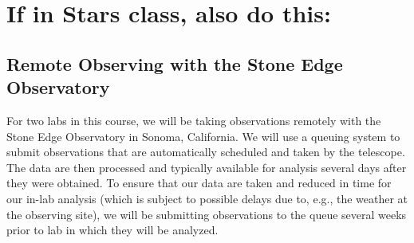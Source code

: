  
 
 

\section{If in Stars class, also do this:}
\subsection{Remote Observing with the Stone Edge Observatory}

For two labs in this course, we will be taking observations remotely with the Stone Edge Observatory in Sonoma, California. We will use a queuing system to submit observations that are automatically scheduled and taken by the telescope. The data are then processed and typically available for analysis several days after they were obtained. To ensure that our data are taken and reduced in time for our in-lab analysis (which is subject to possible delays due to, e.g., the weather at the observing site), we will be submitting observations to the queue several weeks prior to lab in which they will be analyzed.

